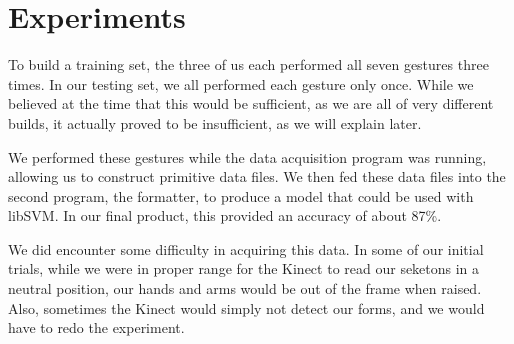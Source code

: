 \documentclass[11pt,conference]{IEEEtran}
\begin{document}
\section{Experiments}
To build a training set, the three of us each performed all seven gestures three times. In our testing set, we all performed each gesture only once. While we believed at the time that this would be sufficient, as we are all of very different builds, it actually proved to be insufficient, as we will explain later.

We performed these gestures while the data acquisition program was running, allowing us to construct primitive data files. We then fed these data files into the second program, the formatter, to produce a model that could be used with libSVM. In our final product, this provided an accuracy of about 87\%.

We did encounter some difficulty in acquiring this data. In some of our initial trials, while we were in proper range for the Kinect to read our seketons in a neutral position, our hands and arms would be out of the frame when raised. Also, sometimes the Kinect would simply not detect our forms, and we would have to redo the experiment.
\end{document}
